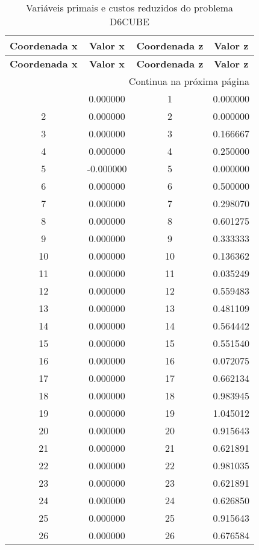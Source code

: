 \documentclass[12pt]{article}
\begin{document}
\begin{longtable}{@{}cccc@{}}
\caption{Variáveis primais e custos reduzidos do problema D6CUBE} \\
\toprule
\textbf{Coordenada x} & \textbf{Valor x} & \textbf{Coordenada z} & \textbf{Valor z} \\
\midrule
\endfirsthead

\toprule
\textbf{Coordenada x} & \textbf{Valor x} & \textbf{Coordenada z} & \textbf{Valor z} \\
\midrule
\endhead

\midrule \multicolumn{4}{r}{{Continua na próxima página}} \\ \midrule
\endfoot

\bottomrule
\endlastfoot
1 & 0.000000 & 1 & 0.000000 \\
2 & 0.000000 & 2 & 0.000000 \\
3 & 0.000000 & 3 & 0.166667 \\
4 & 0.000000 & 4 & 0.250000 \\
5 & -0.000000 & 5 & 0.000000 \\
6 & 0.000000 & 6 & 0.500000 \\
7 & 0.000000 & 7 & 0.298070 \\
8 & 0.000000 & 8 & 0.601275 \\
9 & 0.000000 & 9 & 0.333333 \\
10 & 0.000000 & 10 & 0.136362 \\
11 & 0.000000 & 11 & 0.035249 \\
12 & 0.000000 & 12 & 0.559483 \\
13 & 0.000000 & 13 & 0.481109 \\
14 & 0.000000 & 14 & 0.564442 \\
15 & 0.000000 & 15 & 0.551540 \\
16 & 0.000000 & 16 & 0.072075 \\
17 & 0.000000 & 17 & 0.662134 \\
18 & 0.000000 & 18 & 0.983945 \\
19 & 0.000000 & 19 & 1.045012 \\
20 & 0.000000 & 20 & 0.915643 \\
21 & 0.000000 & 21 & 0.621891 \\
22 & 0.000000 & 22 & 0.981035 \\
23 & 0.000000 & 23 & 0.621891 \\
24 & 0.000000 & 24 & 0.626850 \\
25 & 0.000000 & 25 & 0.915643 \\
26 & 0.000000 & 26 & 0.676584 \\

\end{longtable}
\end{document}
